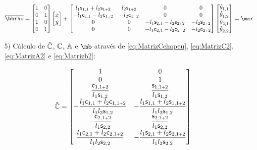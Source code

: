 \documentclass[a4paper,11pt,brazil,fleqn]{article}
\begin{document}
\begin{itemize}
\begin{equation}
\overline{\mrho} =  
\begin{bmatrix}
1 & 0 \\
0 & 1 \\
1 & 0 \\
0 & 1 \\
\end{bmatrix}
\begin{bmatrix}
\dot{x} \\
\dot{y} \\
\end{bmatrix}
+ 
 \begin{bmatrix}
 l_1 \ssin_{1,1} + l_2 \ssin_{1\plus 2} &  l_2 \ssin_{1\plus 2} & 0 & 0 \\
-l_1 \ccos_{1,1} - l_2 \ccos_{1\plus 2} & -l_2 \ccos_{1\plus 2} & 0 & 0  \\
0 & 0 & -l_1 \ssin_{2,1} - l_2 \ssin_{2\plus 2} & -l_2 \ssin_{2\plus 2}  \\
0 & 0 & -l_1 \ccos_{2,1} - l_2 \ccos_{2\plus 2} & -l_2 \ccos_{2\plus 2}   \\
\end{bmatrix}
\begin{bmatrix}
\dot{\theta}_{1,1} \\
\dot{\theta}_{1,2} \\
\dot{\theta}_{2,1} \\
\dot{\theta}_{2,2} \\
\end{bmatrix} = \mzr
\end{equation}

\item[5)] C\'alculo de $\hat{\mathbb{C}}$, $\mathbb{C}$, $\mathbb{A}$ e $\mb$ atrav\'es de \eqref{eq:MatrizCchapeu}, \eqref{eq:MatrizC2}, \eqref{eq:MatrizA2} e \eqref{eq:Matrizb2}:

\begin{equation}
\hat{\mathbb{C}} =
\begin{bmatrix}
1 & 0 \\
0 & 1 \\
\displaystyle\frac{\mathsf{c}_{1,1{\scriptscriptstyle +} 2}}{l_1 \mathsf{s}_{1,2}} & \displaystyle\frac{\mathsf{s}_{1,1{\scriptscriptstyle +} 2}}{l_1 \mathsf{s}_{1,2}} \\
-\displaystyle\frac{l_1\mathsf{c}_{1,1} + l_2\mathsf{c}_{1,1{\scriptscriptstyle +} 2}}{l_1 l_2 \mathsf{s}_{1,2}} & -\displaystyle\frac{l_1\mathsf{s}_{1,1} + l_2\mathsf{s}_{1,1{\scriptscriptstyle +} 2}}{l_1 l_2 \mathsf{s}_{1,2}} \\
-\displaystyle\frac{\mathsf{c}_{2,1{\scriptscriptstyle +} 2}}{l_1 \mathsf{s}_{2,2}} & \displaystyle\frac{\mathsf{s}_{2,1{\scriptscriptstyle +} 2}}{l_1 \mathsf{s}_{2,2}} \\
\displaystyle\frac{l_1\mathsf{c}_{2,1} + l_2\mathsf{c}_{2,1{\scriptscriptstyle +} 2}}{l_1 l_2 \mathsf{s}_{2,2}} & -\displaystyle\frac{l_1\mathsf{s}_{2,1} + l_2\mathsf{s}_{2,1{\scriptscriptstyle +} 2}}{l_1 l_2 \mathsf{s}_{2,2}} \\
\end{bmatrix}
\end{equation}


\end{itemize}
\end{document}
